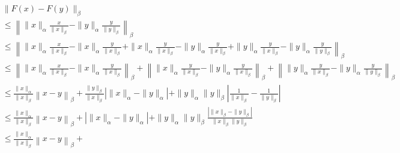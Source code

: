 \documentclass[10pt,a4paper]{article}
\begin{document}
    \begin{align*}
        &
        \| 
            F(x) - F(y) 
        \|_{\beta}
        \\&\leq 
        \left\| 
            \| x \|_{\alpha} \frac{ x }{ \| x \|_{\beta} } 
            - 
            \| y \|_{\alpha} \frac{ y }{ \| y \|_{\beta} } 
        \right\|_{\beta}
        \\&\leq 
        \left\| 
            \| x \|_{\alpha} \frac{ x }{ \| x \|_{\beta} } 
            - 
            \| x \|_{\alpha} \frac{ y }{ \| x \|_{\beta} } 
            + 
            \| x \|_{\alpha} \frac{ y }{ \| x \|_{\beta} } 
            - 
            \| y \|_{\alpha} \frac{ y }{ \| x \|_{\beta} } 
            + 
            \| y \|_{\alpha} \frac{ y }{ \| x \|_{\beta} } 
            - 
            \| y \|_{\alpha} \frac{ y }{ \| y \|_{\beta} } 
        \right\|_{\beta}
        \\&\leq 
        \left\| 
            \| x \|_{\alpha} \frac{ x }{ \| x \|_{\beta} } 
            - 
            \| x \|_{\alpha} \frac{ y }{ \| x \|_{\beta} } 
        \right\|_{\beta}
            + 
        \left\| 
            \| x \|_{\alpha} \frac{ y }{ \| x \|_{\beta} } 
            - 
            \| y \|_{\alpha} \frac{ y }{ \| x \|_{\beta} } 
        \right\|_{\beta}
            + 
        \left\| 
            \| y \|_{\alpha} \frac{ y }{ \| x \|_{\beta} } 
            - 
            \| y \|_{\alpha} \frac{ y }{ \| y \|_{\beta} } 
        \right\|_{\beta}
        \\&\leq 
        \frac{ \| x \|_{\alpha} }{ \| x \|_{\beta} } 
        \left\| 
            x - y
        \right\|_{\beta}
            + 
        \frac{ \| y \|_{\beta} }{ \| x \|_{\beta} } 
        \left| \| x \|_{\alpha} - \| y \|_{\alpha} \right|
        + 
        \| y \|_{\alpha} \| y \|_{\beta} 
        \left| 
            \frac{ 1 }{ \| x \|_{\beta} } 
            - 
            \frac{ 1 }{ \| y \|_{\beta} }  
        \right|
        \\&\leq 
        \frac{ \| x \|_{\alpha} }{ \| x \|_{\beta} } 
        \left\| 
            x - y
        \right\|_{\beta}
        + 
        \left| \| x \|_{\alpha} - \| y \|_{\alpha} \right|
        + 
        \| y \|_{\alpha} \| y \|_{\beta} 
        \frac{ \left| \| x \|_{\beta} - \| y \|_{\beta} \right| }{ \| x \|_{\beta} \| y \|_{\beta} }
        \\&\leq 
        \frac{ \| x \|_{\alpha} }{ \| x \|_{\beta} } 
        \left\| 
            x - y
        \right\|_{\beta}
            + 

\end{align*}
\end{document}
